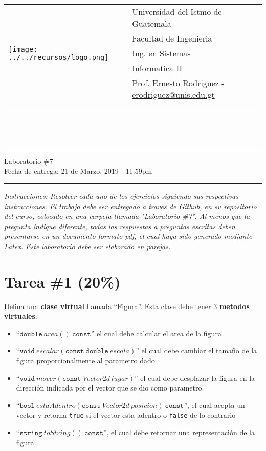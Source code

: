 \documentclass{article}
\newcommand{\horrule}[1]{\rule{\linewidth}{#1}}
\begin{document}
\begin{tabular}{l l}
\multirow{5}{*}{\texttt{[image: ../../recursos/logo.png]}} & Universidad del Istmo de Guatemala \\
 & Facultad de Ingenieria \\
 & Ing. en Sistemas \\
 & Informatica II \\
 & Prof. Ernesto Rodriguez - \href{mailto:erodriguez@unis.edu.gt}{erodriguez@unis.edu.gt} \\
\end{tabular}
\\\\\\

\begin{center}
        \horrule{0.5pt}
        \huge{Laboratorio \#7} \\
        \large{Fecha de entrega: 21 de Marzo, 2019 - 11:59pm} \\
        \horrule{1pt}
\end{center}

\emph{Instrucciones: Resolver cada uno de los ejercicios siguiendo sus respectivas
instrucciones. El trabajo debe ser entregado a traves de Github, en su repositorio del curso, colocado en una carpeta llamada "Laboratorio \#7".
Al menos que la pregunta indique diferente, todas las respuestas a preguntas escritas deben presentarse en
un documento formato pdf, el cual haya sido generado mediante Latex. Este laboratorio
debe ser elaborado en parejas.}

\section*{Tarea \#1 (20\%)}

Defina una {\bf clase virtual} llamada ``Figura''. Esta clase debe
tener 3 {\bf metodos virtuales}:
\begin{itemize}
        \item{``$\mathtt{double}\ area()\ \mathtt{const}$'' el cual debe calcular el area de la figura}
        \item{``$\mathtt{void}\ escalar(\mathtt{const\ double}\ escala)$'' el cual debe cambiar el tama\~no de la
        figura proporcionalmente al parametro dado}
        \item{``$\mathtt{void}\ mover(\mathtt{const}\ Vector2d\ lugar)$'' el cual debe desplazar la figura en la direcci\'on
        indicada por el vector que se dio como parametro.}
        \item{``$\mathtt{bool}\ estaAdentro(\mathtt{const}\ Vector2d\ posicion)\ \mathtt{const}$'', el cual acepta un
        vector y retorna \texttt{true} si el vector esta adentro o \texttt{false} de lo contrario}
        \item{``$\mathtt{string}\ toString()\ \mathtt{const}$'', el cual debe retornar una representaci\'on
        de la figura.}
\end{itemize}
\end{document}
